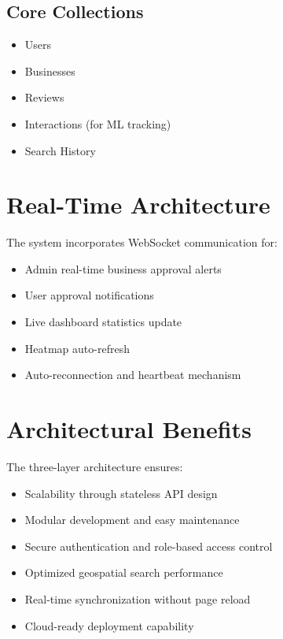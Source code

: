 \documentclass[12pt,a4paper]{report}
\begin{document}
\subsection*{Core Collections}

\begin{itemize}

\item Users

\item Businesses

\item Reviews

\item Interactions (for ML tracking)

\item Search History

\end{itemize}

\section{Real-Time Architecture}

The system incorporates WebSocket communication for:

\begin{itemize}

\item Admin real-time business approval alerts

\item User approval notifications

\item Live dashboard statistics update

\item Heatmap auto-refresh

\item Auto-reconnection and heartbeat mechanism

\end{itemize}

\section{Architectural Benefits}

The three-layer architecture ensures:

\begin{itemize}

\item Scalability through stateless API design

\item Modular development and easy maintenance

\item Secure authentication and role-based access control

\item Optimized geospatial search performance

\item Real-time synchronization without page reload

\item Cloud-ready deployment capability

\end{itemize}
\end{document}
